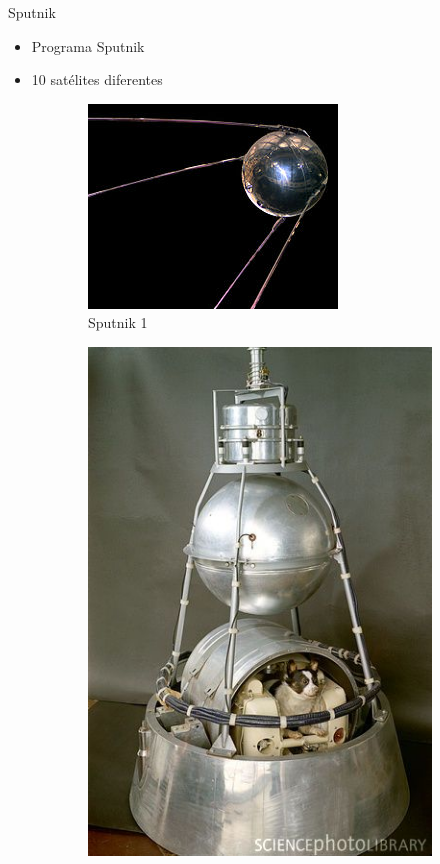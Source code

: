 

\begin{frame}[fragile]{Sputnik}
\vspace{10px}
\pause
{}
\begin{block}{}
	\begin{itemize}
		\item Programa Sputnik
		\pause
		\item 10 satélites diferentes
	\end{itemize}
\end{block}
\begin{figure}
		\centering
		\pause
		\begin{subfigure}{0.33\textwidth}
			\centering
			\includegraphics[scale=1.3]{./EtapaPrimeriza/imagenes/s1.jpg}
			\caption{Sputnik 1}
		\end{subfigure}
		\pause
		\begin{subfigure}{0.33\textwidth}
			\centering
			\includegraphics[scale=1.0]{./EtapaPrimeriza/imagenes/s2.jpg}

\end{subfigure}
\end{figure}
\end{frame}
